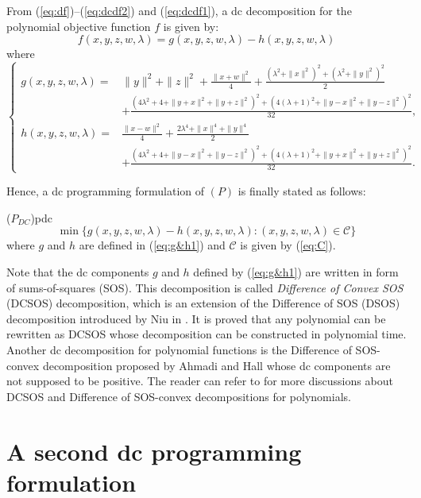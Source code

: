 \documentclass[3p]{elsarticle}
\begin{document}
From (\ref{eq:df})--(\ref{eq:dcdf2}) and (\ref{eq:dcdf1}), a dc decomposition for the polynomial objective function $f$ is given by:
\begin{equation}
f(x,y,z,w,\lambda) = g(x,y,z,w,\lambda) - h(x,y,z,w,\lambda)
\end{equation}
where 
\begin{equation}\label{eq:g&h1}
\left\{\begin{array}{ll}
g(x,y,z,w,\lambda) = &\|y\|^2 + \|z\|^2 + \frac{\|x+w\|^2}{4} + \frac{(\lambda^2 + \|x\|^2)^2 + (\lambda^2 + \|y\|^2)^2}{2} \\
& + \frac{(4\lambda^2+4 + \|y+x\|^2 + \|y+z\|^2)^2 + (4(\lambda+1)^2 + \|y-x\|^2 + \|y-z\|^2)^2}{32},\\
h(x,y,z,w,\lambda) = &\frac{\|x-w\|^2}{4} + \frac{2\lambda^4 + \|x\|^4 + \|y\|^4}{2} \\
&+ \frac{(4\lambda^2+4 + \|y-x\|^2 + \|y-z\|^2)^2 + (4(\lambda+1)^2 + \|y+x\|^2 + \|y+z\|^2)^2}{32}.
\end{array}
\right.
\end{equation}

Hence, a dc programming formulation of $(P)$ is finally stated as follows:

\begin{Dcp}{($P_{DC}$)}{pdc}
	\begin{equation}\label{prob:pdc}
	 \min \{g(x,y,z,w,\lambda)-h(x,y,z,w,\lambda): (x,y,z,w,\lambda)\in \mathcal{C}\}
	\end{equation} 
	where $g$ and $h$ are defined in (\ref{eq:g&h1}) and $\mathcal{C}$ is given by (\ref{eq:C}).
\end{Dcp}

Note that the dc components $g$ and $h$ defined by (\ref{eq:g&h1}) are written in form of sums-of-squares (SOS). This decomposition is called \emph{Difference of Convex SOS} (DCSOS) decomposition, which is an extension of the Difference of SOS (DSOS) decomposition introduced by Niu in \cite{Niu17}. It is proved that any polynomial can be rewritten as DCSOS whose decomposition can be constructed in polynomial time. Another dc decomposition for polynomial functions is the Difference of SOS-convex decomposition proposed by Ahmadi and Hall \cite{Ahmadi} whose dc components are not supposed to be positive. The reader can refer to \cite{Niu17,Ahmadi} for more discussions about DCSOS and Difference of SOS-convex decompositions for polynomials.

\section{A second dc programming formulation}\label{sec:dcpofPhat}
\end{document}
